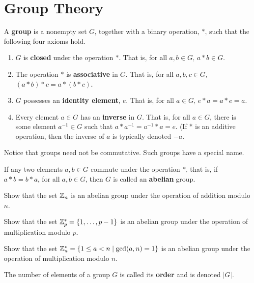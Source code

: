 	\section{Group Theory}
	\label{ssec-groups}

\begin{definition}
A {\bf group} is a nonempty set $G$, together with a binary operation, $*$, such that the following four axioms hold.
\begin{enumerate}
	\item $G$ is {\bf closed} under the operation $*$. That is, for all $a, b\in G$, $a*b \in G$.
	\item The operation $*$ is {\bf associative} in $G$. That is, for all $a, b, c\in G$, $(a*b)*c = a*(b*c)$.
	\item $G$ possesses an {\bf identity element}, $e$. That is, for all $a \in G$, $e*a = a*e = a$.
	\item Every element $a\in G$ has an {\bf inverse} in $G$. That is, for all $a\in G$, there is some element $a^{-1}\in G$ such that $a*a^{-1} = a^{-1}*a = e$. (If * is an additive operation, then the inverse of $a$ is typically denoted $-a$.
\end{enumerate}
\end{definition}
Notice that groups need not be commutative. Such groups have a special name.
\begin{definition}
	If any two elements $a, b\in G$ commute under the operation $*$, that is, if $a*b = b*a$, for all $a,b\in G$, then $G$ is called an {\bf abelian} group.
\end{definition}

\begin{problem}  [10 points]
	Show that the set $\mathbb{Z}_n$ is an abelian group under the operation of addition modulo $n$.
\end{problem}
\begin{problem}  [10 points]
	Show that the set $\mathbb{Z}_p^* = \{1, \ldots, p-1\}$ is an abelian group under the operation of multiplication modulo $p$.
\end{problem}

\begin{problem}  [10 points]
	Show that the set $\mathbb{Z}_n^* = \{1\le a <n \mid \gcd(a, n)=1\}$ is an abelian group under the operation of multiplication modulo $n$.
\end{problem}

\begin{definition}
	The number of elements of a group $G$ is called its {\bf order} and is denoted $|G|$.
\end{definition}

